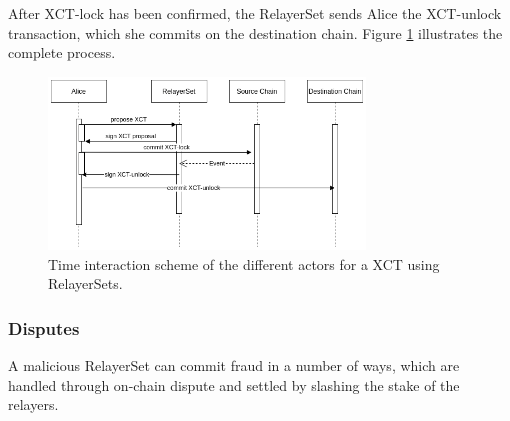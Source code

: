 After XCT-lock has been confirmed, the RelayerSet sends Alice the XCT-unlock transaction, which she commits on the destination chain. Figure \ref{fig:v3_protocol} illustrates the complete process.

\begin{figure}[h]
    \centering
    \includegraphics[width=0.75\textwidth]{images/mosaic/phase3/protocol.png}
    \caption{Time interaction scheme of the different actors for a XCT using RelayerSets. }
    \label{fig:v3_protocol}
\end{figure}

\subsubsection*{Disputes}
A malicious RelayerSet can commit fraud in a number of ways, which are handled through on-chain dispute and settled by slashing the stake of the relayers.


